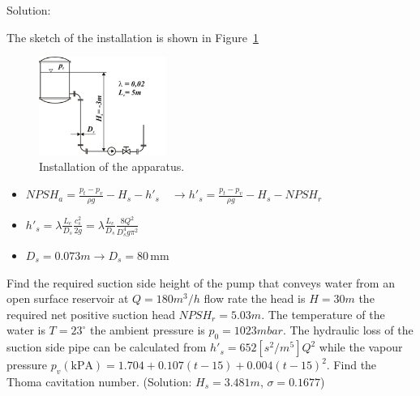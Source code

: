 \noindent Solution:

\noindent The sketch of the installation is shown in Figure~\ref{fig:NPSH_figure1}

\begin{figure}[ht]
\centering
\includegraphics[width=0.37\textwidth]{Problem_solving/figs/PS_NPSH_figure1.png}
\caption{\label{fig:NPSH_figure1}Installation of the apparatus.}
\end{figure}

\begin{itemize}
\item $\mathit{NPSH}_a=\frac{p_t-p_v}{\rho g}-H_s-h'_s\quad\rightarrow h'_s=\frac{p_t-p_v}{\rho g}-H_s-\mathit{NPSH}_r$
\item $h'_s=\lambda \frac{L_e}{D_s}\frac{c^2_s}{2g}=\lambda \frac{L_e}{D_s}\frac{8Q^2}{D^4_s g \pi^2}$
\item $D_s=0.073m\rightarrow D_s=80\,\mathrm{mm}$
\end{itemize}

\vspace{1cm}

Find the required suction side height of the pump that conveys water from an open surface reservoir at $Q=180m^3/h$ flow rate the head is $H=30m$ the required net positive suction head $\mathit{NPSH}_r=5.03m$. The temperature of the water is $T=23^\circ$ the ambient pressure is $p_0=1023mbar$. The hydraulic loss of the suction side pipe can be calculated from $h'_s=652[s^2/m^5]Q^2$ while the vapour pressure $p_v (\mathrm{kPA})=1.704+0.107(t-15)+0.004(t-15)^2$. Find the Thoma cavitation number. (Solution: $H_s=3.481m$, $\sigma=0.1677$)


